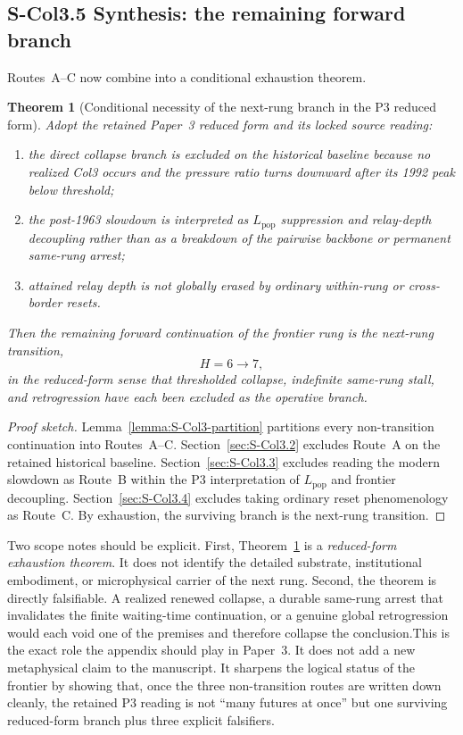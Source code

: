\documentclass[11pt]{article}
\newtheorem{theorem}{Theorem}
\begin{document}
\subsection*{S-Col3.5 Synthesis: the remaining forward branch}
\label{sec:S-Col3.5}Routes~A--C now combine into a conditional exhaustion theorem.
\begin{theorem}[Conditional necessity of the next-rung branch in the P3 reduced form]
\label{thm:S-Col3-H7-necessity}Adopt the retained Paper~3 reduced form and its locked source reading:
\begin{enumerate}\item the direct collapse branch is excluded on the historical baseline because no realized Col3 occurs and the pressure ratio turns downward after its 1992 peak below threshold;\item the post-1963 slowdown is interpreted as $L_{\mathrm{pop}}$ suppression and relay-depth decoupling rather than as a breakdown of the pairwise backbone or permanent same-rung arrest;\item attained relay depth is not globally erased by ordinary within-rung or cross-border resets.
\end{enumerate}Then the remaining forward continuation of the frontier rung is the next-rung transition,\[H=6\longrightarrow 7,\]in the reduced-form sense that thresholded collapse, indefinite same-rung stall, and retrogression have each been excluded as the operative branch.
\end{theorem}
\begin{proof}[Proof sketch]Lemma~\ref{lemma:S-Col3-partition} partitions every non-transition continuation into Routes~A--C. Section~\ref{sec:S-Col3.2} excludes Route~A on the retained historical baseline. Section~\ref{sec:S-Col3.3} excludes reading the modern slowdown as Route~B within the P3 interpretation of $L_{\mathrm{pop}}$ and frontier decoupling. Section~\ref{sec:S-Col3.4} excludes taking ordinary reset phenomenology as Route~C. By exhaustion, the surviving branch is the next-rung transition.
\end{proof}Two scope notes should be explicit. First, Theorem~\ref{thm:S-Col3-H7-necessity} is a \emph{reduced-form exhaustion theorem}. It does not identify the detailed substrate, institutional embodiment, or microphysical carrier of the next rung. Second, the theorem is directly falsifiable. A realized renewed collapse, a durable same-rung arrest that invalidates the finite waiting-time continuation, or a genuine global retrogression would each void one of the premises and therefore collapse the conclusion.This is the exact role the appendix should play in Paper~3. It does not add a new metaphysical claim to the manuscript. It sharpens the logical status of the frontier by showing that, once the three non-transition routes are written down cleanly, the retained P3 reading is not ``many futures at once'' but one surviving reduced-form branch plus three explicit falsifiers.
\end{document}
